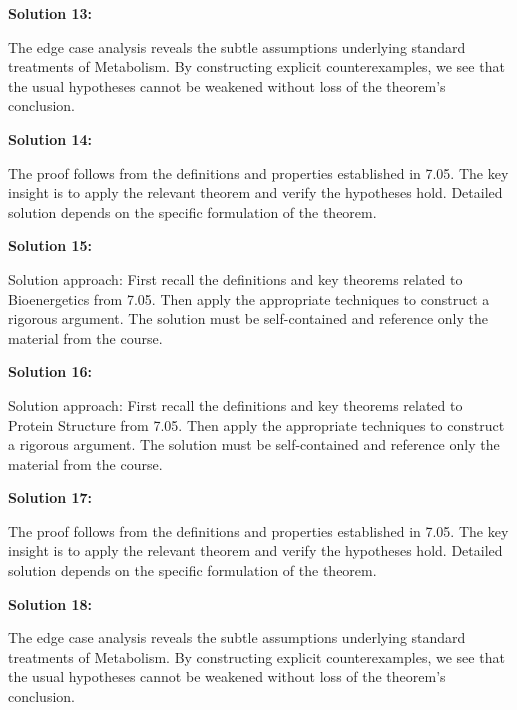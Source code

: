 \documentclass[12pt,a4paper]{exam}
\begin{document}
\vspace{0.5cm}

\textbf{Solution 13:}

The edge case analysis reveals the subtle assumptions underlying standard treatments of Metabolism. By constructing explicit counterexamples, we see that the usual hypotheses cannot be weakened without loss of the theorem's conclusion.

\vspace{0.5cm}

\textbf{Solution 14:}

The proof follows from the definitions and properties established in 7.05. The key insight is to apply the relevant theorem and verify the hypotheses hold. Detailed solution depends on the specific formulation of the theorem.

\vspace{0.5cm}

\textbf{Solution 15:}

Solution approach: First recall the definitions and key theorems related to Bioenergetics from 7.05. Then apply the appropriate techniques to construct a rigorous argument. The solution must be self-contained and reference only the material from the course.

\vspace{0.5cm}

\textbf{Solution 16:}

Solution approach: First recall the definitions and key theorems related to Protein Structure from 7.05. Then apply the appropriate techniques to construct a rigorous argument. The solution must be self-contained and reference only the material from the course.

\vspace{0.5cm}

\textbf{Solution 17:}

The proof follows from the definitions and properties established in 7.05. The key insight is to apply the relevant theorem and verify the hypotheses hold. Detailed solution depends on the specific formulation of the theorem.

\vspace{0.5cm}

\textbf{Solution 18:}

The edge case analysis reveals the subtle assumptions underlying standard treatments of Metabolism. By constructing explicit counterexamples, we see that the usual hypotheses cannot be weakened without loss of the theorem's conclusion.
\end{document}
